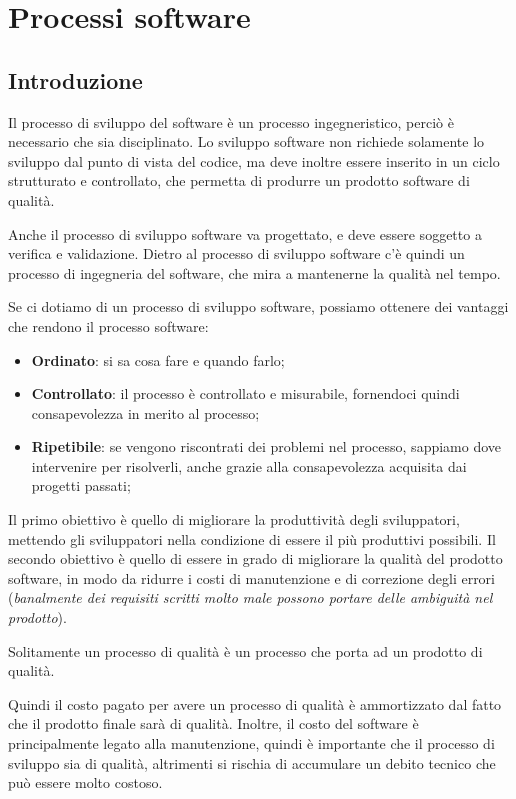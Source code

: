 \chapter{Processi software}
\section{Introduzione}
Il processo di sviluppo del software è un processo
ingegneristico, perciò è necessario che sia disciplinato.
Lo sviluppo software non richiede solamente lo sviluppo dal punto di 
vista del codice, ma deve inoltre essere
inserito in un ciclo strutturato e controllato, che permetta di
produrre un prodotto software di qualità.

Anche il processo di sviluppo software va progettato, e deve essere
soggetto a verifica e validazione. Dietro al processo di sviluppo
software c'è quindi un processo di ingegneria del software, che
mira a mantenerne la qualità nel tempo.

Se ci dotiamo di un processo di sviluppo software, possiamo
ottenere dei vantaggi che rendono il processo software:
\begin{itemize}
\item \textbf{Ordinato}: si sa cosa fare e quando farlo;
\item \textbf{Controllato}: il processo è controllato e misurabile, fornendoci 
quindi consapevolezza in merito al processo;
\item \textbf{Ripetibile}: se vengono riscontrati dei problemi nel processo,
sappiamo dove intervenire per risolverli, anche grazie alla consapevolezza 
acquisita dai progetti passati;
\end{itemize}
Il primo obiettivo è quello di migliorare la produttività degli sviluppatori, mettendo 
gli sviluppatori nella condizione di essere il più produttivi possibili. 
Il secondo obiettivo è quello di essere in grado di migliorare la qualità del prodotto
software, in modo da ridurre i costi di manutenzione e di correzione degli errori 
(\textit{banalmente dei requisiti scritti molto male possono portare delle ambiguità 
nel prodotto}).
\begin{tcolorbox}
    Solitamente un processo di qualità è un processo che porta ad un prodotto di qualità.
\end{tcolorbox}
Quindi il costo pagato per avere un processo di qualità è ammortizzato dal fatto che
il prodotto finale sarà di qualità. Inoltre, il costo del software è principalmente
legato alla manutenzione, quindi è importante che il processo di sviluppo sia di qualità,
altrimenti si rischia di accumulare un debito tecnico che può essere molto costoso.

